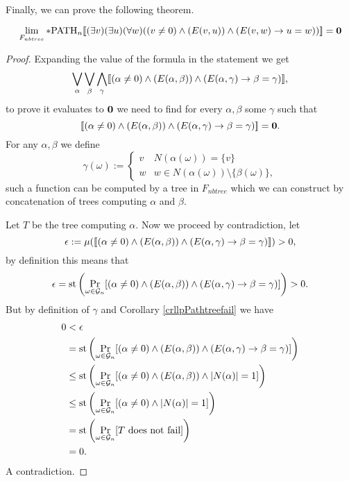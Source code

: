 Finally, we can prove the following theorem.

\begin{thrm}\label{thrmnoend}
\[\lim_{F_{nbtree}}*\text{PATH}_n[\![(\exists v)(\exists u)(\forall w)((v\not=0)\land (E(v,u)) \land(E(v,w) \to u=w))]\!]=\textbf{0}\]
\end{thrm}
\begin{proof}
Expanding the value of the formula in the statement we get
\[\bigvee_{\alpha}\bigvee_{\beta}\bigwedge_{\gamma}[\![(\alpha\not=0)\land (E(\alpha,\beta)) \land(E(\alpha,\gamma) \to \beta=\gamma)]\!],\]
to prove it evaluates to $\textbf{0}$ we need to find for every $\alpha,\beta$ some $\gamma$ such that
\[[\![(\alpha\not=0)\land (E(\alpha,\beta)) \land(E(\alpha,\gamma) \to \beta=\gamma)]\!]=\textbf{0}.\]
For any $\alpha,\beta$ we define
\[\gamma(\omega):=\begin{cases}v&N(\alpha(\omega))=\{v\}\\w&w\in N(\alpha(\omega))\setminus\{\beta(\omega)\},\end{cases}\]
such a function can be computed by a tree in $F_{nbtree}$ which we can construct by concatenation of trees computing $\alpha$ and $\beta$.

Let $T$ be the tree computing $\alpha$. Now we proceed by contradiction, let
\[\epsilon:=\mu([\![(\alpha\not=0)\land (E(\alpha,\beta)) \land(E(\alpha,\gamma) \to \beta=\gamma)]\!])>0,\]
by definition this means that
\[\epsilon=\text{st}\left(\Pr_{\omega \in \mathcal{G}_n}[(\alpha\not=0)\land (E(\alpha,\beta)) \land(E(\alpha,\gamma) \to \beta=\gamma)]\right)>0.\]
But by definition of $\gamma$ and Corollary \ref{crllpPathtreefail} we have
\begin{align*}
0&<\epsilon\\
&=   \text{st}\left(\Pr_{\omega\in \mathcal{G}_n}[(\alpha\not=0)\land (E(\alpha,\beta)) \land(E(\alpha,\gamma) \to \beta=\gamma)]\right)\\
&\leq\text{st}\left(\Pr_{\omega \in \mathcal{G}_n}[(\alpha\not=0)\land (E(\alpha,\beta)) \land \left|{N(\alpha)}\right|=1]\right)\\
&\leq\text{st}\left(\Pr_{\omega\in\mathcal{G}_n}[(\alpha\not=0)\land \left|{N(\alpha)}\right|=1]\right)\\
&=   \text{st}\left(\Pr_{\omega\in\mathcal{G}_n}[T\text{ does not fail}]\right)\\
&=0.
\end{align*}
A contradiction.
\end{proof}

